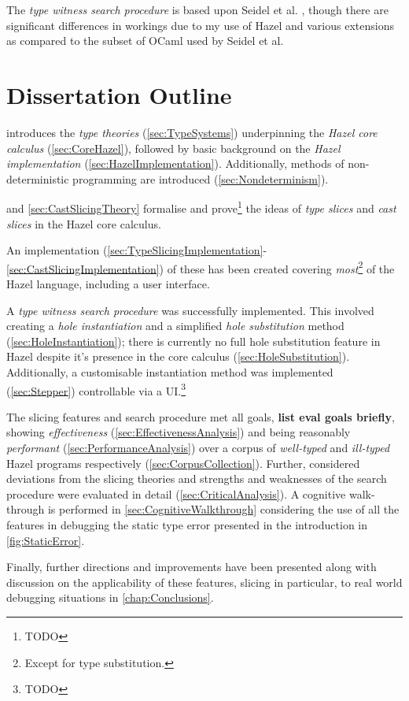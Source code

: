 The \textit{type witness search procedure} is	 based upon Seidel et al. \cite{SearchProc}, though there are significant differences in workings due to my use of Hazel and various extensions as compared to the subset of OCaml used by Seidel et al.

\section{Dissertation Outline}
\label{sec:Outline}
 introduces the \textit{type theories} (\cref{sec:TypeSystems}) underpinning the \textit{Hazel core calculus} (\cref{sec:CoreHazel}), followed by basic background on the \textit{Hazel implementation} (\cref{sec:HazelImplementation}). Additionally, methods of non-deterministic programming are introduced (\cref{sec:Nondeterminism}).

 and \cref{sec:CastSlicingTheory} formalise and prove\footnote{TODO} the ideas of \textit{type slices} and \textit{cast slices} in the Hazel core calculus. 
 
 An implementation (\cref{sec:TypeSlicingImplementation}-\ref{sec:CastSlicingImplementation}) of these has been created covering \textit{most}\footnote{Except for type substitution.} of the Hazel language, including a user interface. 
 
 A \textit{type witness search procedure} was successfully implemented. This involved creating a \textit{hole instantiation} and a simplified \textit{hole substitution} method (\cref{sec:HoleInstantiation}); there is currently no full hole substitution feature in Hazel despite it's presence in the core calculus (\cref{sec:HoleSubstitution}). Additionally, a customisable instantiation method was implemented (\cref{sec:Stepper}) controllable via a UI.\footnote{TODO}

The slicing features and search procedure met all goals, \textbf{list eval goals briefly}, showing \textit{effectiveness} (\cref{sec:EffectivenessAnalysis}) and being reasonably \textit{performant} (\cref{sec:PerformanceAnalysis}) over a corpus of \textit{well-typed} and \textit{ill-typed} Hazel programs respectively (\cref{sec:CorpusCollection}). Further, considered deviations from the slicing theories and strengths and weaknesses of the search procedure were evaluated in detail (\cref{sec:CriticalAnalysis}). A cognitive walk-through is performed in \cref{sec:CognitiveWalkthrough} considering the use of all the features in debugging the static type error presented in the introduction in \cref{fig:StaticError}.

Finally, further directions and improvements have been presented along with discussion on the applicability of these features, slicing in particular, to real world debugging situations in \cref{chap:Conclusions}.